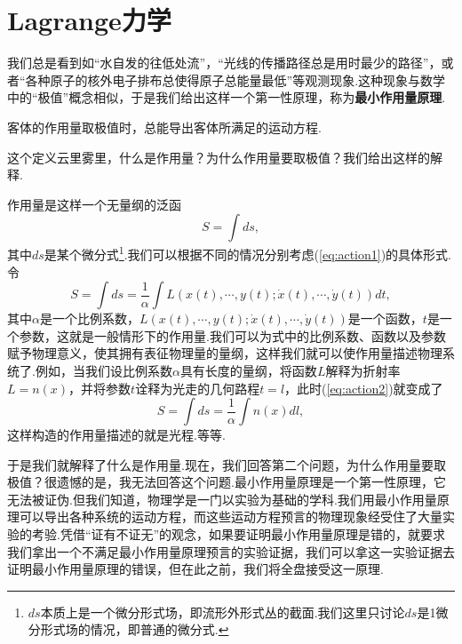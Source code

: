	\section{Lagrange力学}\label{sec:Lagrange}
		
		我们总是看到如“水自发的往低处流”，“光线的传播路径总是用时最少的路径”，或者“各种原子的核外电子排布总使得原子总能量最低”等观测现象.这种现象与数学中的“极值”概念相似，于是我们给出这样一个第一性原理，称为\textbf{最小作用量原理}.
		\begin{definition}
			客体的作用量取极值时，总能导出客体所满足的运动方程.
		\end{definition}
		这个定义云里雾里，什么是作用量？为什么作用量要取极值？我们给出这样的解释.
		
		作用量是这样一个无量纲的泛函
		\begin{equation}\label{eq:action1}
			S=\int ds,
		\end{equation}
		其中$ds$是某个微分式\footnote{$ds$本质上是一个微分形式场，即流形外形式丛的截面.我们这里只讨论$ds$是1微分形式场的情况，即普通的微分式.}.我们可以根据不同的情况分别考虑(\ref{eq:action1})的具体形式.令
		\begin{equation}\label{eq:action2}
			S=\int ds=\frac{1}{\alpha}\int L(x(t),\cdots,y(t);\dot{x}(t),\cdots,\dot{y}(t))dt,
		\end{equation}
		其中$\alpha$是一个比例系数，$L(x(t),\cdots,y(t);\dot{x}(t),\cdots,\dot{y}(t))$是一个函数，$t$是一个参数，这就是一般情形下的作用量.我们可以为式中的比例系数、函数以及参数赋予物理意义，使其拥有表征物理量的量纲，这样我们就可以使作用量描述物理系统了.例如，当我们设比例系数$\alpha$具有长度的量纲，将函数$L$解释为折射率$L=n(x)$，并将参数$t$诠释为光走的几何路程$t=l$，此时(\ref{eq:action2})就变成了
		$$S=\int ds=\frac{1}{\alpha}\int n(x)dl,$$
		这样构造的作用量描述的就是光程.等等.

		于是我们就解释了什么是作用量.现在，我们回答第二个问题，为什么作用量要取极值？很遗憾的是，我无法回答这个问题.最小作用量原理是一个第一性原理，它无法被证伪.但我们知道，物理学是一门以实验为基础的学科.我们用最小作用量原理可以导出各种系统的运动方程，而这些运动方程预言的物理现象经受住了大量实验的考验.凭借“证有不证无”的观念，如果要证明最小作用量原理是错的，就要求我们拿出一个不满足最小作用量原理预言的实验证据，我们可以拿这一实验证据去证明最小作用量原理的错误，但在此之前，我们将全盘接受这一原理.

